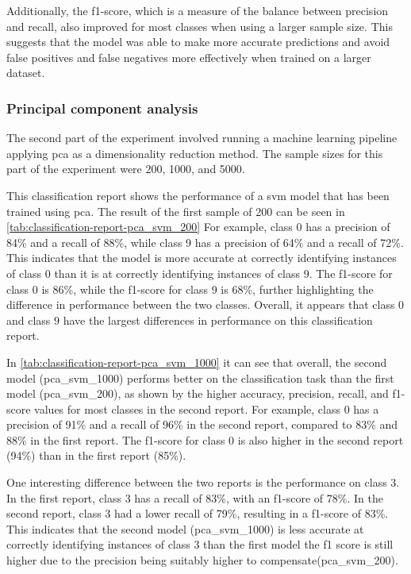 Additionally, the f1-score, which is a measure of the balance between precision and recall, also improved for most classes when using a larger sample size. This suggests that the model was able to make more accurate predictions and avoid false positives and false negatives more effectively when trained on a larger dataset.


\subsubsection{Principal component analysis}\label{subsubsec:experiment_4_pca}

The second part of the experiment involved running a machine learning pipeline applying \gls{pca} as a dimensionality reduction method. The sample sizes for this part of the experiment were 200, 1000, and 5000.



This classification report shows the performance of a \gls{svm} model that has been trained using \gls{pca}. The result of the first sample of 200 can be seen in \ref{tab:classification-report-pca_svm_200}
For example, class 0 has a precision of 84\% and a recall of 88\%, while class 9 has a precision of 64\% and a recall of 72\%. This indicates that the model is more accurate at correctly identifying instances of class 0 than it is at correctly identifying instances of class 9. The f1-score for class 0 is 86\%, while the f1-score for class 9 is 68\%, further highlighting the difference in performance between the two classes. Overall, it appears that class 0 and class 9 have the largest differences in performance on this classification report.



In \ref{tab:classification-report-pca_svm_1000} it can see that overall, the second model (pca\_svm\_1000) performs better on the classification task than the first model (pca\_svm\_200), as shown by the higher accuracy, precision, recall, and f1-score values for most classes in the second report. For example, class 0 has a precision of 91\% and a recall of 96\% in the second report, compared to 83\% and 88\% in the first report. The f1-score for class 0 is also higher in the second report (94\%) than in the first report (85\%).

One interesting difference between the two reports is the performance on class 3. In the first report, class 3 has a recall of 83\%, with an f1-score of 78\%. In the second report, class 3 had a lower recall of 79\%, resulting in a f1-score of 83\%. This indicates that the second model (pca\_svm\_1000) is less accurate at correctly identifying instances of class 3 than the first model the f1 score is still higher due to the precision being suitably higher to compensate(pca\_svm\_200).

